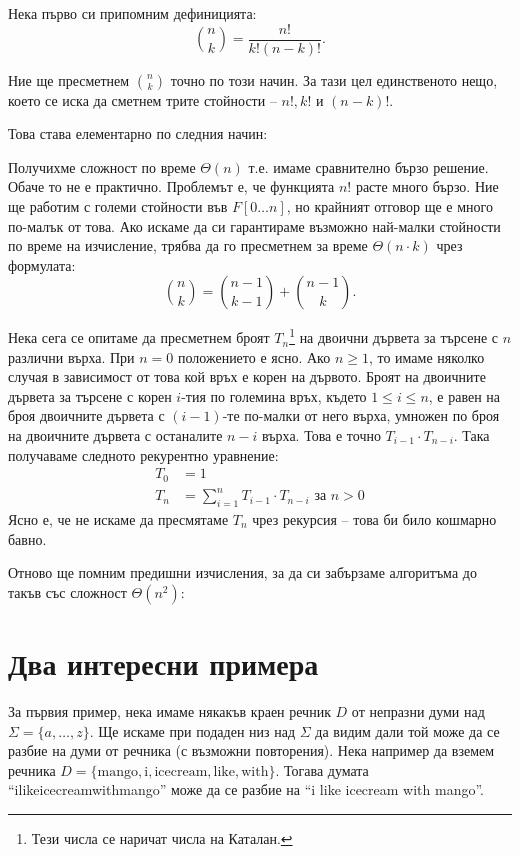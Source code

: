 Нека първо си припомним дефиницията:
\[
    {n \choose k} = \frac{n!}{k! (n - k)!}.
\]

Ние ще пресметнем ${n \choose k}$ точно по този начин.
За тази цел единственото нещо, което се иска да сметнем трите стойности -- $n!, k!$ и $(n - k)!$.

\newpage

Това става елементарно по следния начин:

Получихме сложност по време $\Theta(n)$ т.е. имаме сравнително бързо решение.
Обаче то не е практично.
Проблемът е, че функцията $n!$ расте много бързо.
Ние ще работим с големи стойности във $F[0 \dots n]$, но крайният отговор ще е много по-малък от това.
Ако искаме да си гарантираме възможно най-малки стойности по време на изчисление, трябва да го пресметнем за време $\Theta(n \cdot k)$ чрез формулата:
\[
    {n \choose k} = {n - 1 \choose k - 1} + {n - 1 \choose k}.
\]

Нека сега се опитаме да пресметнем броят $T_n$\footnote{Тези числа се наричат числа на Каталан.} на двоични дървета за търсене с $n$ различни върха.
При $n = 0$ положението е ясно.
Ако $n \geq 1$, то имаме няколко случая в зависимост от това кой връх е корен на дървото.
Броят на двоичните дървета за търсене с корен $i$-тия по големина връх, където $1 \leq i \leq n$, е равен на броя двоичните дървета с $(i - 1)$-те по-малки от него върха, умножен по броя на двоичните дървета с останалите $n - i$ върха.
Това е точно $T_{i - 1} \cdot T_{n - i}$.
Така получаваме следното рекурентно уравнение:
\begin{align*}
    T_0 & = 1                                                                 \\
    T_n & = \sum\limits_{i = 1}^n T_{i - 1} \cdot T_{n - i} \text{ за } n > 0
\end{align*}
Ясно е, че не искаме да пресмятаме $T_n$ чрез рекурсия -- това би било кошмарно бавно.

\newpage

Отново ще помним предишни изчисления, за да си забързаме алгоритъма до такъв със сложност $\Theta(n^2)$:


\section{Два интересни примера}

За първия пример, нека имаме някакъв краен речник $D$ от непразни думи над $\Sigma = \{ a, \dots, z \}$.
Ще искаме при подаден низ над $\Sigma$ да видим дали той може да се разбие на думи от речника (с възможни повторения).
Нека например да вземем речника $D = \{ \text{mango}, \text{i}, \text{icecream}, \text{like}, \text{with} \}$.
Тогава думата ``ilikeicecreamwithmango'' може да се разбие на ``i like icecream with mango''.

